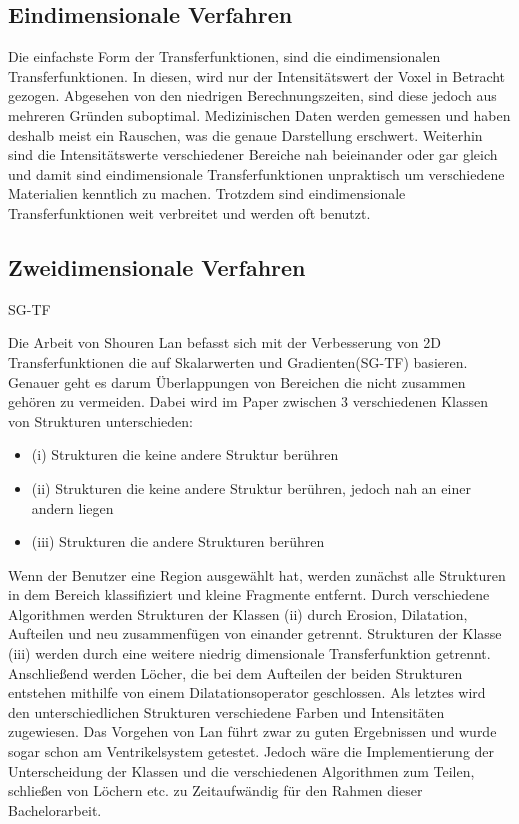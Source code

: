 \subsection{Eindimensionale Verfahren}

Die einfachste Form der Transferfunktionen, sind die eindimensionalen Transferfunktionen. In diesen, wird nur der Intensitätswert der Voxel in Betracht gezogen. Abgesehen von den niedrigen Berechnungszeiten, sind diese jedoch aus mehreren Gründen suboptimal. Medizinischen Daten werden gemessen und haben deshalb meist ein Rauschen, was die genaue Darstellung erschwert. Weiterhin sind die Intensitätswerte verschiedener Bereiche nah beieinander oder gar gleich und damit sind eindimensionale Transferfunktionen unpraktisch um verschiedene Materialien kenntlich zu machen. Trotzdem sind eindimensionale Transferfunktionen weit verbreitet und werden oft benutzt. 
\newline


\subsection{Zweidimensionale Verfahren}

\cite{kniss2002multidimensional} SG-TF


Die Arbeit von Shouren Lan \cite{lan2017improving} befasst sich mit der Verbesserung von 2D Transferfunktionen die auf Skalarwerten und Gradienten(SG-TF) basieren. Genauer geht es darum Überlappungen von Bereichen die nicht zusammen gehören zu vermeiden.
\newline
Dabei wird im Paper zwischen 3 verschiedenen Klassen von Strukturen unterschieden:
\begin{itemize}
\item (i) Strukturen die keine andere Struktur berühren
\item (ii) Strukturen die keine andere Struktur berühren, jedoch nah an einer andern liegen
\item (iii) Strukturen die andere Strukturen berühren
\end{itemize} 
Wenn der Benutzer eine Region ausgewählt hat, werden zunächst alle Strukturen in dem Bereich klassifiziert und kleine Fragmente entfernt. Durch verschiedene Algorithmen werden Strukturen der Klassen (ii) durch Erosion, Dilatation, Aufteilen und neu zusammenfügen von einander getrennt. Strukturen der Klasse (iii) werden durch eine weitere niedrig dimensionale Transferfunktion getrennt. Anschließend werden Löcher, die bei dem Aufteilen der beiden Strukturen entstehen mithilfe von einem Dilatationsoperator geschlossen. Als letztes wird den unterschiedlichen Strukturen verschiedene Farben und Intensitäten zugewiesen.
\newline
Das Vorgehen von Lan führt zwar zu guten Ergebnissen und wurde sogar schon am Ventrikelsystem getestet. Jedoch wäre die Implementierung der Unterscheidung der Klassen und die verschiedenen Algorithmen zum Teilen, schließen von Löchern etc. zu Zeitaufwändig für den Rahmen dieser Bachelorarbeit.



